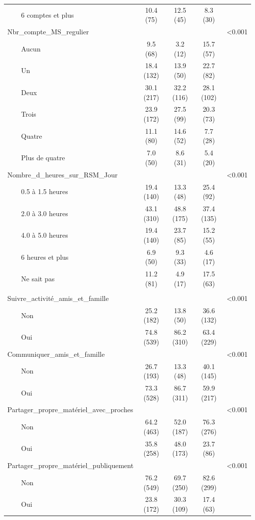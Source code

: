 \documentclass[
]{article}
\begin{document}
\begin{table}[!t]
\begin{tabular*}{\linewidth}{@{\extracolsep{\fill}}lcccc}
    6 comptes et plus & 10.4 (75) & 12.5 (45) & 8.3 (30) &  \\ 
Nbr\_compte\_MS\_regulier &  &  &  & <0.001 \\ 
    Aucun & 9.5 (68) & 3.2 (12) & 15.7 (57) &  \\ 
    Un & 18.4 (132) & 13.9 (50) & 22.7 (82) &  \\ 
    Deux & 30.1 (217) & 32.2 (116) & 28.1 (102) &  \\ 
    Trois & 23.9 (172) & 27.5 (99) & 20.3 (73) &  \\ 
    Quatre & 11.1 (80) & 14.6 (52) & 7.7 (28) &  \\ 
    Plus de quatre & 7.0 (50) & 8.6 (31) & 5.4 (20) &  \\ 
Nombre\_d\_heures\_sur\_RSM\_Jour &  &  &  & <0.001 \\ 
    0.5 à 1.5 heures & 19.4 (140) & 13.3 (48) & 25.4 (92) &  \\ 
    2.0 à 3.0 heures & 43.1 (310) & 48.8 (175) & 37.4 (135) &  \\ 
    4.0 à 5.0 heures & 19.4 (140) & 23.7 (85) & 15.2 (55) &  \\ 
    6 heures et plus & 6.9 (50) & 9.3 (33) & 4.6 (17) &  \\ 
    Ne sait pas & 11.2 (81) & 4.9 (17) & 17.5 (63) &  \\ 
\midrule\addlinespace[2.5pt]
\multicolumn{5}{l}{activités\_médias\_sociaux} \\[2.5pt] 
\midrule\addlinespace[2.5pt]
Suivre\_activité\_amis\_et\_famille &  &  &  & <0.001 \\ 
    Non & 25.2 (182) & 13.8 (50) & 36.6 (132) &  \\ 
    Oui & 74.8 (539) & 86.2 (310) & 63.4 (229) &  \\ 
Communiquer\_amis\_et\_famille &  &  &  & <0.001 \\ 
    Non & 26.7 (193) & 13.3 (48) & 40.1 (145) &  \\ 
    Oui & 73.3 (528) & 86.7 (311) & 59.9 (217) &  \\ 
Partager\_propre\_matériel\_avec\_proches &  &  &  & <0.001 \\ 
    Non & 64.2 (463) & 52.0 (187) & 76.3 (276) &  \\ 
    Oui & 35.8 (258) & 48.0 (173) & 23.7 (86) &  \\ 
Partager\_propre\_matériel\_publiquement &  &  &  & <0.001 \\ 
    Non & 76.2 (549) & 69.7 (250) & 82.6 (299) &  \\ 
    Oui & 23.8 (172) & 30.3 (109) & 17.4 (63) &  \\ 

\end{tabular*}
\end{table}
\end{document}

